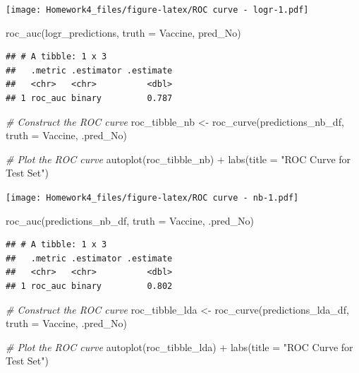 \documentclass[
]{article}
\newenvironment{Shaded}{\begin{snugshade}}{\end{snugshade}}
\newcommand{\AttributeTok}[1]{\textcolor[rgb]{0.77,0.63,0.00}{#1}}
\newcommand{\CommentTok}[1]{\textcolor[rgb]{0.56,0.35,0.01}{\textit{#1}}}
\newcommand{\FunctionTok}[1]{\textcolor[rgb]{0.00,0.00,0.00}{#1}}
\newcommand{\NormalTok}[1]{#1}
\newcommand{\OtherTok}[1]{\textcolor[rgb]{0.56,0.35,0.01}{#1}}
\newcommand{\SpecialCharTok}[1]{\textcolor[rgb]{0.00,0.00,0.00}{#1}}
\newcommand{\StringTok}[1]{\textcolor[rgb]{0.31,0.60,0.02}{#1}}
\begin{document}
\texttt{[image: Homework4\_files/figure-latex/ROC curve - logr-1.pdf]}

\begin{Shaded}
\begin{Highlighting}[]
\FunctionTok{roc\_auc}\NormalTok{(logr\_predictions, }\AttributeTok{truth =}\NormalTok{ Vaccine, pred\_No)}
\end{Highlighting}
\end{Shaded}

\begin{verbatim}
## # A tibble: 1 x 3
##   .metric .estimator .estimate
##   <chr>   <chr>          <dbl>
## 1 roc_auc binary         0.787
\end{verbatim}

\begin{Shaded}
\begin{Highlighting}[]
\CommentTok{\# Construct the ROC curve}
\NormalTok{roc\_tibble\_nb }\OtherTok{\textless{}{-}} \FunctionTok{roc\_curve}\NormalTok{(predictions\_nb\_df, }\AttributeTok{truth =}\NormalTok{ Vaccine, .pred\_No)}

\CommentTok{\# Plot the ROC curve}
\FunctionTok{autoplot}\NormalTok{(roc\_tibble\_nb) }\SpecialCharTok{+} \FunctionTok{labs}\NormalTok{(}\AttributeTok{title =} \StringTok{"ROC Curve for Test Set"}\NormalTok{)}
\end{Highlighting}
\end{Shaded}

\texttt{[image: Homework4\_files/figure-latex/ROC curve - nb-1.pdf]}

\begin{Shaded}
\begin{Highlighting}[]
\FunctionTok{roc\_auc}\NormalTok{(predictions\_nb\_df, }\AttributeTok{truth =}\NormalTok{ Vaccine, .pred\_No)}
\end{Highlighting}
\end{Shaded}

\begin{verbatim}
## # A tibble: 1 x 3
##   .metric .estimator .estimate
##   <chr>   <chr>          <dbl>
## 1 roc_auc binary         0.802
\end{verbatim}

\begin{Shaded}
\begin{Highlighting}[]
\CommentTok{\# Construct the ROC curve}
\NormalTok{roc\_tibble\_lda }\OtherTok{\textless{}{-}} \FunctionTok{roc\_curve}\NormalTok{(predictions\_lda\_df, }\AttributeTok{truth =}\NormalTok{ Vaccine, .pred\_No)}

\CommentTok{\# Plot the ROC curve}
\FunctionTok{autoplot}\NormalTok{(roc\_tibble\_lda) }\SpecialCharTok{+} \FunctionTok{labs}\NormalTok{(}\AttributeTok{title =} \StringTok{"ROC Curve for Test Set"}\NormalTok{)}
\end{Highlighting}
\end{Shaded}
\end{document}
